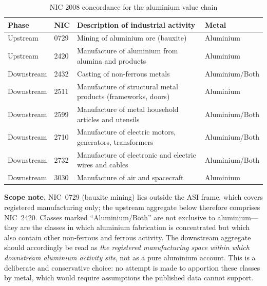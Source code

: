 \documentclass[11pt, a4paper]{article}
\numberwithin{figure}{section}
\numberwithin{table}{section}
\begin{document}
\begin{table}[H]
    \centering
    \caption{NIC 2008 concordance for the aluminium value chain}
    \label{tab:nic_concordance}
    \begin{tabular}{llp{7.6cm}l}
        \toprule
        \textbf{Phase} & \textbf{NIC} & \textbf{Description of industrial activity} & \textbf{Metal} \\
        \midrule
        Upstream & 0729 & Mining of aluminium ore (bauxite) & Aluminium \\
        Upstream & 2420 & Manufacture of aluminium from alumina and products & Aluminium \\
        \midrule
        Downstream & 2432 & Casting of non-ferrous metals & Aluminium/Both \\
        Downstream & 2511 & Manufacture of structural metal products (frameworks, doors) & Aluminium \\
        Downstream & 2599 & Manufacture of metal household articles and utensils & Aluminium/Both \\
        Downstream & 2710 & Manufacture of electric motors, generators, transformers & Aluminium/Both \\
        Downstream & 2732 & Manufacture of electronic and electric wires and cables & Aluminium/Both \\
        Downstream & 3030 & Manufacture of air and spacecraft & Aluminium \\
        \bottomrule
    \end{tabular}

    \vspace{0.2cm}
    \raggedright
    \small \textbf{Scope note.} NIC~0729 (bauxite mining) lies outside the ASI frame, which covers registered manufacturing only; the upstream aggregate below therefore comprises NIC~2420. Classes marked ``Aluminium/Both'' are not exclusive to aluminium---they are the classes in which aluminium fabrication is concentrated but which also contain other non-ferrous and ferrous activity. The downstream aggregate should accordingly be read as \emph{the registered manufacturing space within which downstream aluminium activity sits}, not as a pure aluminium account. This is a deliberate and conservative choice: no attempt is made to apportion these classes by metal, which would require assumptions the published data cannot support.
\end{table}
\end{document}
